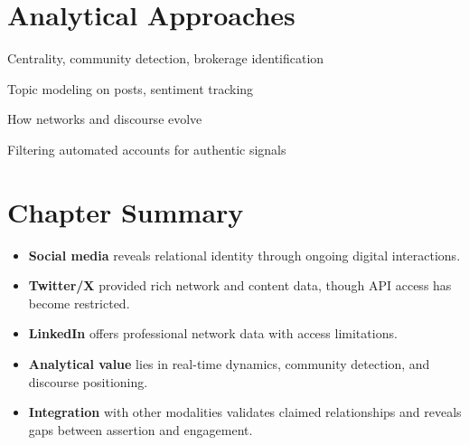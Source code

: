 \section*{Analytical Approaches}

\begin{description}[leftmargin=0.5cm, itemsep=0.3em]
\item[Network Analysis] Centrality, community detection, brokerage identification
\item[Content Analysis] Topic modeling on posts, sentiment tracking
\item[Temporal Dynamics] How networks and discourse evolve
\item[Bot Detection] Filtering automated accounts for authentic signals
\end{description}


\section*{Chapter Summary}

\begin{summarybox}
\begin{itemize}[leftmargin=*, itemsep=0.3em]
\item \textbf{Social media} reveals relational identity through ongoing digital interactions.

\item \textbf{Twitter/X} provided rich network and content data, though API access has become restricted.

\item \textbf{LinkedIn} offers professional network data with access limitations.

\item \textbf{Analytical value} lies in real-time dynamics, community detection, and discourse positioning.

\item \textbf{Integration} with other modalities validates claimed relationships and reveals gaps between assertion and engagement.
\end{itemize}
\end{summarybox}
